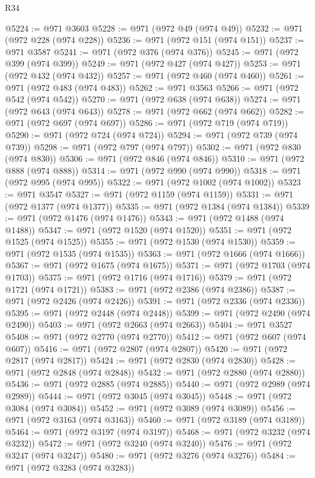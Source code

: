\begin{lexlean}{R34}
\begin{coremodule}
@5224 := @971 @3603
@5228 := @971 (@972 @49 (@974 @49))
@5232 := @971 (@972 @228 (@974 @228))
@5236 := @971 (@972 @151 (@974 @151))
@5237 := @971 @3587
@5241 := @971 (@972 @376 (@974 @376))
@5245 := @971 (@972 @399 (@974 @399))
@5249 := @971 (@972 @427 (@974 @427))
@5253 := @971 (@972 @432 (@974 @432))
@5257 := @971 (@972 @460 (@974 @460))
@5261 := @971 (@972 @483 (@974 @483))
@5262 := @971 @3563
@5266 := @971 (@972 @542 (@974 @542))
@5270 := @971 (@972 @638 (@974 @638))
@5274 := @971 (@972 @643 (@974 @643))
@5278 := @971 (@972 @662 (@974 @662))
@5282 := @971 (@972 @697 (@974 @697))
@5286 := @971 (@972 @719 (@974 @719))
@5290 := @971 (@972 @724 (@974 @724))
@5294 := @971 (@972 @739 (@974 @739))
@5298 := @971 (@972 @797 (@974 @797))
@5302 := @971 (@972 @830 (@974 @830))
@5306 := @971 (@972 @846 (@974 @846))
@5310 := @971 (@972 @888 (@974 @888))
@5314 := @971 (@972 @990 (@974 @990))
@5318 := @971 (@972 @995 (@974 @995))
@5322 := @971 (@972 @1002 (@974 @1002))
@5323 := @971 @3547
@5327 := @971 (@972 @1159 (@974 @1159))
@5331 := @971 (@972 @1377 (@974 @1377))
@5335 := @971 (@972 @1384 (@974 @1384))
@5339 := @971 (@972 @1476 (@974 @1476))
@5343 := @971 (@972 @1488 (@974 @1488))
@5347 := @971 (@972 @1520 (@974 @1520))
@5351 := @971 (@972 @1525 (@974 @1525))
@5355 := @971 (@972 @1530 (@974 @1530))
@5359 := @971 (@972 @1535 (@974 @1535))
@5363 := @971 (@972 @1666 (@974 @1666))
@5367 := @971 (@972 @1675 (@974 @1675))
@5371 := @971 (@972 @1703 (@974 @1703))
@5375 := @971 (@972 @1716 (@974 @1716))
@5379 := @971 (@972 @1721 (@974 @1721))
@5383 := @971 (@972 @2386 (@974 @2386))
@5387 := @971 (@972 @2426 (@974 @2426))
@5391 := @971 (@972 @2336 (@974 @2336))
@5395 := @971 (@972 @2448 (@974 @2448))
@5399 := @971 (@972 @2490 (@974 @2490))
@5403 := @971 (@972 @2663 (@974 @2663))
@5404 := @971 @3527
@5408 := @971 (@972 @2770 (@974 @2770))
@5412 := @971 (@972 @607 (@974 @607))
@5416 := @971 (@972 @2807 (@974 @2807))
@5420 := @971 (@972 @2817 (@974 @2817))
@5424 := @971 (@972 @2830 (@974 @2830))
@5428 := @971 (@972 @2848 (@974 @2848))
@5432 := @971 (@972 @2880 (@974 @2880))
@5436 := @971 (@972 @2885 (@974 @2885))
@5440 := @971 (@972 @2989 (@974 @2989))
@5444 := @971 (@972 @3045 (@974 @3045))
@5448 := @971 (@972 @3084 (@974 @3084))
@5452 := @971 (@972 @3089 (@974 @3089))
@5456 := @971 (@972 @3163 (@974 @3163))
@5460 := @971 (@972 @3189 (@974 @3189))
@5464 := @971 (@972 @3197 (@974 @3197))
@5468 := @971 (@972 @3232 (@974 @3232))
@5472 := @971 (@972 @3240 (@974 @3240))
@5476 := @971 (@972 @3247 (@974 @3247))
@5480 := @971 (@972 @3276 (@974 @3276))
@5484 := @971 (@972 @3283 (@974 @3283))

\end{coremodule}
\end{lexlean}
